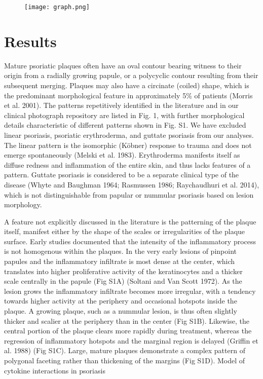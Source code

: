 \begin{figure}[!ht]
	\centering
	\texttt{[image: graph.png]}
	\label{fig:pso2}
\end{figure}
	
\section{Results}
Mature psoriatic plaques often have an oval contour bearing witness to their origin from a radially growing papule, or a polycyclic contour resulting from their subsequent merging. Plaques may also have a circinate (coiled) shape, which is the predominant morphological feature in approximately 5\% of patients (Morris et al. 2001). The patterns repetitively identified in the literature and in our clinical photograph repository are listed in Fig. 1, with further morphological details characteristic of different patterns shown in Fig. S1. We have excluded linear psoriasis, psoriatic erythroderma, and guttate psoriasis from our analyses. The linear pattern is the isomorphic (Köbner) response to trauma and does not emerge spontaneously (Melski et al. 1983). Erythroderma manifests itself as diffuse redness and inflammation of the entire skin, and thus lacks features of a pattern. Guttate psoriasis is considered to be a separate clinical type of the disease (Whyte and Baughman 1964; Rasmussen 1986; Raychaudhuri et al. 2014), which is not distinguishable from papular or nummular psoriasis based on lesion morphology. 

A feature not explicitly discussed in the literature is the patterning of the plaque itself, manifest either by the shape of the scales or irregularities of the plaque surface. Early studies documented that the intensity of the inflammatory process is not homogenous within the plaques. In the very early lesions of pinpoint papules and the inflammatory infiltrate is most dense at the center, which translates into higher proliferative activity of the keratinocytes and a thicker scale centrally in the papule (Fig S1A) (Soltani and Van Scott 1972). As the lesion grows the inflammatory infiltrate becomes more irregular, with a tendency towards higher activity at the periphery and occasional hotspots inside the plaque. A growing plaque, such as a nummular lesion, is thus often slightly thicker and scalier at the periphery than in the center (Fig S1B). Likewise, the central portion of the plaque clears more rapidly during treatment, whereas the regression of inflammatory hotspots and the marginal region is delayed (Griffin et al. 1988) (Fig S1C). Large, mature plaques demonstrate a complex pattern of polygonal faceting rather than thickening of the margins (Fig S1D). 
Model of cytokine interactions in psoriasis


